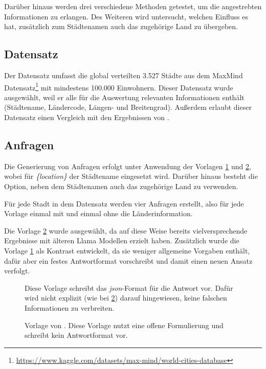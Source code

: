 Darüber hinaus werden drei verschiedene Methoden getestet, um die angestrebten Informationen zu erlangen.
Des Weiteren wird untersucht, welchen Einfluss es hat, zusätzlich zum Städtenamen auch das zugehörige Land zu übergeben.

\subsection{Datensatz}
\label{ss:methods:coords:data}
Der Datensatz umfasst die global verteilten 3.527 Städte aus dem MaxMind Datensatz\footnote{\url{https://www.kaggle.com/datasets/max-mind/world-cities-database}} mit mindestens 100.000 Einwohnern.
Dieser Datensatz wurde ausgewählt, weil er alle für die Auswertung relevanten Informationen enthält (Städtename, Ländercode, Längen- und Breitengrad).
Außerdem erlaubt dieser Datensatz einen Vergleich mit den Ergebnissen von \citet{bhandariAreLargeLanguage2023}.

\subsection{Anfragen}
Die Generierung von Anfragen erfolgt unter Anwendung der Vorlagen \ref{fig_template_json} und \ref{fig_template_original}, wobei für \textit{\{location\}} der Städtename eingesetzt wird.
Darüber hinaus besteht die Option, neben dem Städtenamen auch das zugehörige Land zu verwenden.

Für jede Stadt in dem Datensatz werden vier Anfragen erstellt, also für jede Vorlage einmal mit und einmal ohne die Länderinformation.

Die Vorlage \ref{fig_template_original} wurde ausgewählt, da \citet{bhandariAreLargeLanguage2023} auf diese Weise bereits vielversprechende Ergebnisse mit älteren Llama Modellen erzielt haben.
Zusätzlich wurde die Vorlage \ref{fig_template_json} als Kontrast entwickelt, da sie weniger allgemeine Vorgaben enthält, dafür aber ein festes Antwortformat vorschreibt und damit einen neuen Ansatz verfolgt.

\begin{figure}[tb] %
    
    \caption{Diese Vorlage schreibt das \textit{json}-Format für die Antwort vor. Dafür wird nicht explizit (wie bei \ref{fig_template_original}) darauf hingewiesen, keine falschen Informationen zu verbreiten.}
    \label{fig_template_json}
\end{figure}

\begin{figure}[tb] %
    
    \caption{Vorlage von \citet{bhandariAreLargeLanguage2023}. Diese Vorlage nutzt eine offene Formulierung und schreibt kein Antwortformat vor.}
    \label{fig_template_original}
\end{figure}

